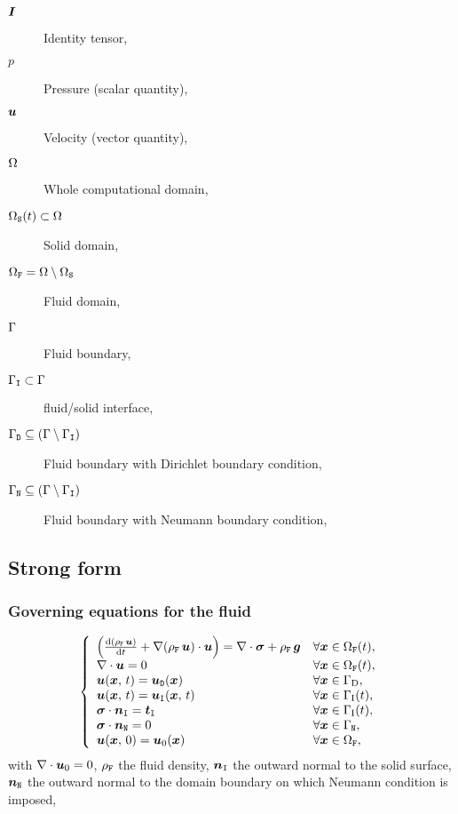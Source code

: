 \documentclass[10pt,a4paper]{article}
\begin{document}
\begin{description}
\item[$\boldsymbol{I}$] Identity tensor,
%
\item[$p$] Pressure (scalar quantity),
%
\item[$\boldsymbol{u}$] Velocity (vector quantity),
%
\item[$\Omega$] Whole computational domain,
%
\item[$\Omega_{\mathtt{S}}(t) \subset \Omega$] Solid domain,
%
\item[$\Omega_{\mathtt{F}} = \Omega \setminus \Omega_{\mathtt{S}}$] Fluid domain,
%
\item[$\Gamma$] Fluid boundary,
%
\item[$\Gamma_{\mathtt{I}}\subset \Gamma$] fluid/solid interface,
%
\item[$\Gamma_{\mathtt{D}}\subseteq (\Gamma\setminus \Gamma_{\mathtt{I}})$] Fluid boundary with Dirichlet boundary condition,
%
\item[$\Gamma_{\mathtt{N}} \subseteq (\Gamma \setminus \Gamma_{\mathtt{I}})$] Fluid boundary with Neumann boundary condition,
%
%
\end{description}

\subsection{Strong form}
%
\subsubsection{Governing equations for the fluid}
\begin{equation}
\left\{
\begin{array}{ll}
\left(\frac{\mathrm{d} (\rho_{\mathtt{F}}\, \boldsymbol{u})}{\mathrm{d} t} + \nabla(\rho_{\mathtt{F}}\, \boldsymbol{u})\cdot \boldsymbol{u}\right)= \nabla\cdot \boldsymbol{\sigma} + \rho_{\mathtt{F}}\, \boldsymbol{g} & \forall \boldsymbol{x} \in \Omega_{\mathtt{F}}(t), \\
\nabla\cdot \boldsymbol{u} = 0 & \forall \boldsymbol{x} \in \Omega_{\mathtt{F}}(t), \\
\boldsymbol{u}(\boldsymbol{x},\,t) = \boldsymbol{u}_{\mathtt{D}}(\boldsymbol{x}) & \forall \boldsymbol{x} \in \Gamma_{\mathrm{D}}, \\
\boldsymbol{u}(\boldsymbol{x},\,t) = \boldsymbol{u}_{\mathtt{I}}(\boldsymbol{x},\,t) & \forall \boldsymbol{x} \in \Gamma_{\mathrm{I}}(t), \\
\boldsymbol{\sigma}\cdot \boldsymbol{n}_{{\mathtt{I}}} = \boldsymbol{t}_{\mathtt{I}} & \forall \boldsymbol{x} \in \Gamma_{\mathrm{I}}(t), \\
\boldsymbol{\sigma}\cdot \boldsymbol{n}_{{\mathtt{N}}} = 0 & \forall \boldsymbol{x} \in \Gamma_{\mathtt{N}}, \\
\boldsymbol{u}(\boldsymbol{x}, \,0) = \boldsymbol{u}_{\mathrm{0}}(\boldsymbol{x}) & \forall \boldsymbol{x} \in \Omega_{\mathtt{F}}, 
\end{array}
\right.
\end{equation}
with $\nabla\cdot \boldsymbol{u}_0 = 0$, $\rho_{\mathtt{F}}$ the fluid density, $\boldsymbol{n}_{{\mathtt{I}}}$ the outward normal to the solid surface, $\boldsymbol{n}_{{\mathtt{N}}}$ the outward normal to the domain boundary on which Neumann condition is imposed,
\end{document}
